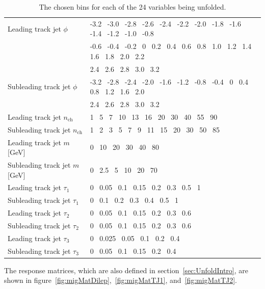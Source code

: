 \begin{table}[h!]
\begin{tabular}{l|l}
    Leading track jet $\phi$                & -3.2~ -3.0~ -2.8~ -2.6~ -2.4~ -2.2~ -2.0~ -1.8~ -1.6~ -1.4~ -1.2~ -1.0~ -0.8~ \\
                                            & -0.6~ -0.4~ -0.2~ 0~ 0.2~ 0.4~ 0.6~ 0.8~ 1.0~ 1.2~ 1.4~ 1.6~ 1.8~ 2.0~ 2.2~ \\
                                            & 2.4~ 2.6~ 2.8~ 3.0~ 3.2 \\ \hline
    Subleading track jet $\phi$             & -3.2~ -2.8~ -2.4~ -2.0~ -1.6~ -1.2~ -0.8~ -0.4~ 0~ 0.4~ 0.8~ 1.2~ 1.6~ 2.0~ \\
                                            & 2.4~ 2.6~ 2.8~ 3.0~ 3.2 \\ \hline
    Leading track jet $n_{\text{ch}}$     & 1~ 5~ 7~ 10~ 13~ 16~ 20~ 30~ 40~ 55~ 90 \\ \hline
    Subleading track jet $n_{\text{ch}}$  & 1~ 2~ 3~ 5~ 7~ 9~ 11~ 15~ 20~ 30~ 50~ 85 \\ \hline
    Leading track jet $m$ [GeV]             & 0~ 10~ 20~ 30~ 40~ 80 \\ \hline
    Subleading track jet $m$ [GeV]          & 0~ 2.5~ 5~ 10~ 20~ 70 \\ \hline
    Leading track jet $\tau_1$              & 0~ 0.05~ 0.1~ 0.15~ 0.2~ 0.3~ 0.5~ 1 \\ \hline
    Subleading track jet $\tau_1$           & 0~ 0.1~ 0.2~ 0.3~ 0.4~ 0.5~ 1 \\ \hline
    Leading track jet $\tau_2$              & 0~ 0.05~ 0.1~ 0.15~ 0.2~ 0.3~ 0.6 \\ \hline
    Subleading track jet $\tau_2$           & 0~ 0.05~ 0.1~ 0.15~ 0.2~ 0.3~ 0.6 \\ \hline
    Leading track jet $\tau_3$              & 0~ 0.025~ 0.05~ 0.1~ 0.2~ 0.4 \\ \hline
    Subleading track jet $\tau_3$           & 0~ 0.05~ 0.1~ 0.15~ 0.2~ 0.4 \\ \hline

    \end{tabular}
    \caption{The chosen bins for each of the 24 variables being unfolded.}
    \label{tab:IBUBins}
\end{table}

The response matrices, which are also defined in section~\ref{sec:UnfoldIntro}, are shown in figure~\ref{fig:migMatDilep},~\ref{fig:migMatTJ1}, and~\ref{fig:migMatTJ2}.

